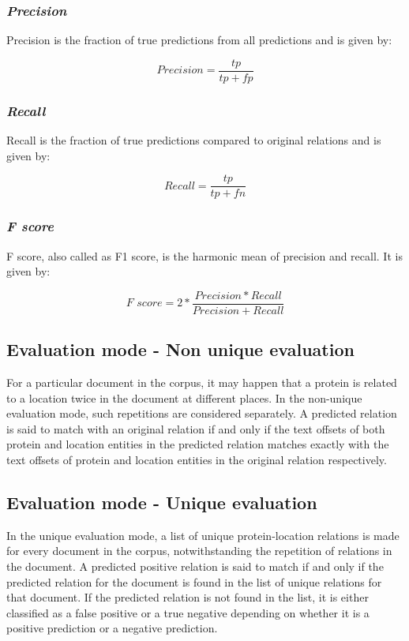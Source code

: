 \subsubsection*{\textit{Precision}}

Precision is the fraction of true predictions from all predictions and is given by:

$$
\textit{Precision} = \frac{tp}{tp+fp}
$$


\subsubsection*{\textit{Recall}}

Recall is the fraction of true predictions compared to original relations and is given by:

$$
\textit{Recall} = \frac{tp}{tp+fn}
$$

\subsubsection*{\textit{F score}}

F score, also called as F1 score, is the harmonic mean of precision and recall. It is given by:

$$
\textit{F score} = 2 * \frac{Precision * Recall}{Precision + Recall}
$$


\subsection{Evaluation mode - Non unique evaluation} \label{subsec:UniqNonUniqEval}

For a particular document in the corpus, it may happen that a protein is related to a location twice in the document at different places. In the non-unique evaluation mode, such repetitions are considered separately. A predicted relation is said to match with an original relation if and only if the text offsets of both protein and location entities in the predicted relation matches exactly with the text offsets of protein and location entities in the original relation respectively.


\subsection{Evaluation mode -  Unique evaluation}

In the unique evaluation mode, a list of unique protein-location relations is made for every document in the corpus, notwithstanding the repetition of relations in the document. A predicted positive relation is said to match if and only if the predicted relation for the document is found in the list of unique relations for that document. If the predicted relation is not found in the list, it is either classified as a false positive or a true negative depending on whether it is a positive prediction or a negative prediction.

